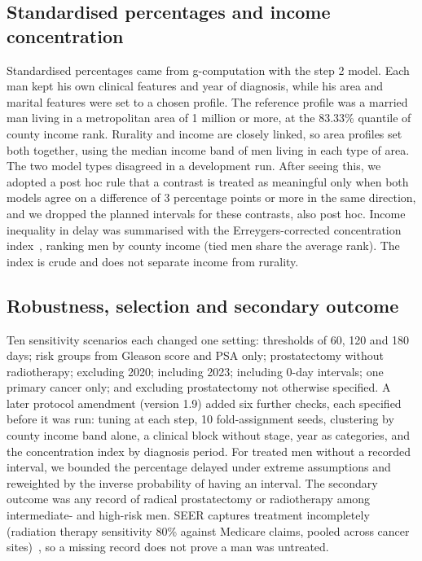 \documentclass[10pt,a4paper,twocolumn]{article}
\begin{document}
\subsection{Standardised percentages and income concentration}
Standardised percentages came from g-computation with the step 2 model. Each man kept his own clinical features and year of diagnosis, while his area and marital features were set to a chosen profile. The reference profile was a married man living in a metropolitan area of 1 million or more, at the 83.33\% quantile of county income rank. Rurality and income are closely linked, so area profiles set both together, using the median income band of men living in each type of area. The two model types disagreed in a development run. After seeing this, we adopted a post hoc rule that a contrast is treated as meaningful only when both models agree on a difference of 3 percentage points or more in the same direction, and we dropped the planned intervals for these contrasts, also post hoc. Income inequality in delay was summarised with the Erreygers-corrected concentration index~\cite{erreygers2009}, ranking men by county income (tied men share the average rank). The index is crude and does not separate income from rurality.

\subsection{Robustness, selection and secondary outcome}
Ten sensitivity scenarios each changed one setting: thresholds of 60, 120 and 180 days; risk groups from Gleason score and PSA only; prostatectomy without radiotherapy; excluding 2020; including 2023; including 0-day intervals; one primary cancer only; and excluding prostatectomy not otherwise specified. A later protocol amendment (version 1.9) added six further checks, each specified before it was run: tuning at each step, 10 fold-assignment seeds, clustering by county income band alone, a clinical block without stage, year as categories, and the concentration index by diagnosis period. For treated men without a recorded interval, we bounded the percentage delayed under extreme assumptions and reweighted by the inverse probability of having an interval. The secondary outcome was any record of radical prostatectomy or radiotherapy among intermediate- and high-risk men. SEER captures treatment incompletely (radiation therapy sensitivity 80\% against Medicare claims, pooled across cancer sites)~\cite{noone2016}, so a missing record does not prove a man was untreated.
\end{document}
